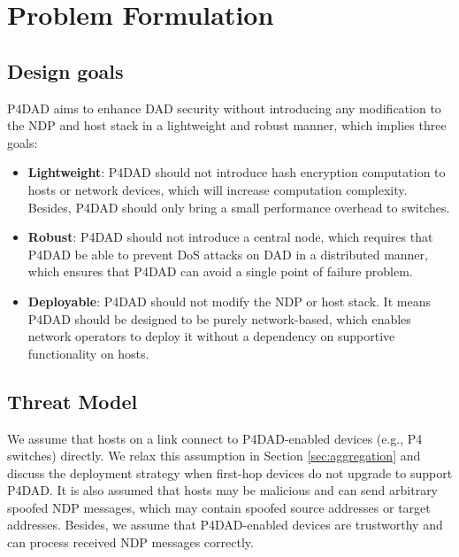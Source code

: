 \documentclass[journal]{IEEEtran}
\begin{document}
\section{Problem Formulation}\label{sec:threat model and design goals}
    \subsection{Design goals}
        P4DAD aims to enhance DAD security without introducing any modification to the NDP and host stack in a lightweight and robust manner, which implies three goals:
        \begin{itemize}
            \item\textbf{Lightweight}: P4DAD should not introduce hash encryption computation to hosts or network devices, which will increase computation complexity. Besides, P4DAD should only bring a small performance overhead to switches.

            \item \textbf{Robust}: 
            P4DAD should not introduce a central node, which requires that P4DAD be able to prevent DoS attacks on DAD in a distributed manner, which ensures that P4DAD can avoid a single point of failure problem.

            \item \textbf{Deployable}: 
            P4DAD should not modify the NDP or host stack. It means P4DAD should be designed to be purely network-based, which enables network operators to deploy it without a dependency on supportive functionality on hosts. 
        \end{itemize}


    \subsection{Threat Model}\label{sec:threat model}
        We assume that hosts on a link connect to P4DAD-enabled devices (e.g., P4 switches) directly. We relax this assumption in Section \ref{sec:aggregation} and discuss the deployment strategy when first-hop devices do not upgrade to support P4DAD.
        It is also assumed that hosts may be malicious and can send arbitrary spoofed NDP messages, which may contain spoofed source addresses or target addresses. Besides, we assume that P4DAD-enabled devices are trustworthy and can process received NDP messages correctly.
        
\end{document}
